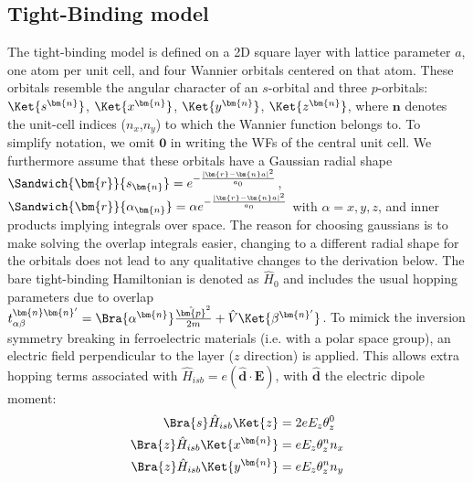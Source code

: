\subsection{Tight-Binding model}
The tight-binding model is defined on a 2D square layer with lattice parameter $a$, one atom per unit cell, and four Wannier orbitals centered on that atom.
These orbitals resemble the angular character of an $s$-orbital and three $p$-orbitals: $\Ket{s^{\bm{n}}}$, $\Ket{x^{\bm{n}}}$, $\Ket{y^{\bm{n}}}$, $\Ket{z^{\bm{n}}}$, where $\bm{n}$ denotes the unit-cell indices ($n_x$,$n_y$) to which the Wannier function belongs to.
To simplify notation, we omit $\bm{0}$ in writing the WFs of the central unit cell.
We furthermore assume that these orbitals have a Gaussian radial shape $\Sandwich{\bm{r}}{s_{\bm{n}}} = e^{-\frac{|\bm{r}-\bm{n}a|^2}{a_0}}$, $\Sandwich{\bm{r}}{\alpha_{\bm{n}}} = \alpha e^{-\frac{|\bm{r}-\bm{n}a|^2}{a_0}}$ with $\alpha = x, y, z$, and inner products implying integrals over space.
The reason for choosing gaussians is to make solving the overlap integrals easier, changing to a different radial shape for the orbitals does not lead to any qualitative changes to the derivation below.
The bare tight-binding Hamiltonian is denoted as $\hat{H}_0$ and includes the usual hopping parameters due to overlap $t_{\alpha\beta}^{\bm{n}\bm{n}'} = \Bra{\alpha^{\bm{n}}}\frac{\hat{\bm{p}}^2}{2m} + \hat{V}\Ket{\beta^{\bm{n}'}}$.
To mimick the inversion symmetry breaking in ferroelectric materials (i.e. with a polar space group), an electric field perpendicular to the layer ($z$ direction) is applied.
This allows extra hopping terms associated with $\hat{H}_{isb} = e (\hat{\bm{d}}\cdot \bm{E})$, with $\hat{\bm{d}}$ the electric dipole moment:
\begin{align}
	\label{eq:dipole}
	\Bra{s} \hat{H}_{isb} \Ket{z} &= 2 e E_z \theta_z^0\\
	\Bra{z} \hat{H}_{isb} \Ket{x^{\bm{n}}} &= e E_z \theta_z^n n_x\\
	\Bra{z} \hat{H}_{isb} \Ket{y^{\bm{n}}} &= e E_z \theta_z^n n_y
\end{align}
